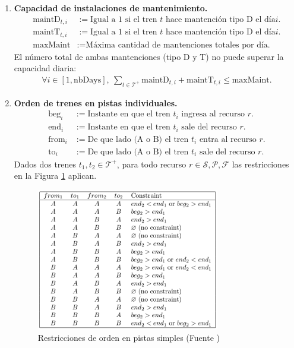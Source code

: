 \documentclass[letter, 10pt]{article}
\begin{document}
\begin{description}
\begin{enumerate}
        \item \textbf{Capacidad de instalaciones de mantenimiento.}
        \begin{align*}
            \text{maintD}_{t,i} &:= \text{Igual a } 1 \text{ si el tren } t \text{ hace mantención tipo D el día} i. \\
            \text{maintT}_{t,i} &:= \text{Igual a } 1 \text{ si el tren } t \text{ hace mantención tipo D el día} i. \\
            \text{maxMaint} &:= \text{Máxima cantidad de mantenciones totales por día.}
        \end{align*}
        El número total de ambas mantenciones (tipo D y T) no puede superar la capacidad diaria:
        \begin{align*}
            \forall i \in [1, \text{nbDays}], \ \sum_{t \in \mathcal{T}^+} \text{maintD}_{t,i} + \text{maintT}_{t,i} \leq \text{maxMaint}.
        \end{align*}
        \item \textbf{Orden de trenes en pistas individuales.}
        \begin{align*}
            \text{beg}_i &:= \text{Instante en que el tren } t_i \text{ ingresa al recurso } r. \\
            \text{end}_i &:= \text{Instante en que el tren } t_i \text{ sale del recurso } r. \\
            \text{from}_i &:= \text{De que lado (A o B) el tren } t_i \text{ entra al recurso } r. \\
            \text{to}_i &:= \text{De que lado (A o B) el tren } t_i \text{ sale del recurso } r.
        \end{align*}
        Dados dos trenes $t_1,t_2 \in \mathcal{T}^+$, para todo recurso $r \in \mathcal{S}, \mathcal{P}, \mathcal{F}$ las restricciones en la Figura \ref{fig:rest} aplican.
         \begin{figure}[htpb!]
        \centering
        \includegraphics[width=8cm]{rest}
        \caption{Restricciones de orden en pistas simples (Fuente \cite{Problem})}
        \label{fig:rest}
        \end{figure}



\end{enumerate}
\end{description}
\end{document}
